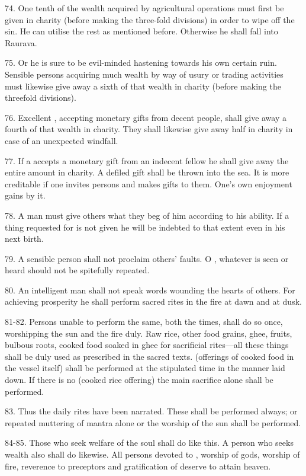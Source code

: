 74. One tenth of the wealth acquired by agricultural operations must first be
given in charity (before making the three-fold divisions) in order to wipe off
the sin. He can utilise the rest as mentioned before. Otherwise he shall fall
into Raurava.

75. Or he is sure to be evil-minded hastening towards his own certain ruin.
Sensible persons acquiring much wealth by way of usury or trading activities
must likewise give away a sixth of that wealth in charity (before making
the threefold divisions).

76. Excellent , accepting monetary gifts from decent people, shall
give away a fourth of that wealth in charity. They shall likewise give away half
in charity in case of an unexpected windfall.

77. If a  accepts a monetary gift from an indecent fellow he shall
give away the entire amount in charity. A defiled gift shall be thrown into
the sea. It is more creditable if one invites persons and makes gifts to them.
One’s own enjoyment gains by it.

78. A man must give others what they beg of him according to his ability. If
a thing requested for is not given he will be indebted to that extent even in
his next birth.

79. A sensible person shall not proclaim others’ faults. O ,
whatever is seen or heard should not be spitefully repeated.

80. An intelligent man shall not speak words wounding the hearts of others. For
achieving prosperity he shall perform sacred rites in the fire at dawn and
at dusk.

81-82. Persons unable to perform the same, both the times, shall do so once,
worshipping the sun and the fire duly. Raw rice, other food grains, ghee,
fruits, bulbous roots, cooked food soaked in ghee for sacrificial rites—all
these things shall be duly used as prescribed in the sacred texts.
 (offerings of cooked food in the vessel itself) shall be
performed at the stipulated time in the manner laid down. If there is no
 (cooked rice offering) the main sacrifice alone shall be performed.

83. Thus the daily rites have been narrated. These shall be performed always; or
repeated muttering of mantra alone or the worship of the sun shall be performed.

84-85. Those who seek welfare of the soul shall do like this. A person who seeks
wealth also shall do likewise. All persons devoted to , worship
of gods, worship of fire, reverence to preceptors and gratification of
 deserve to attain heaven.
